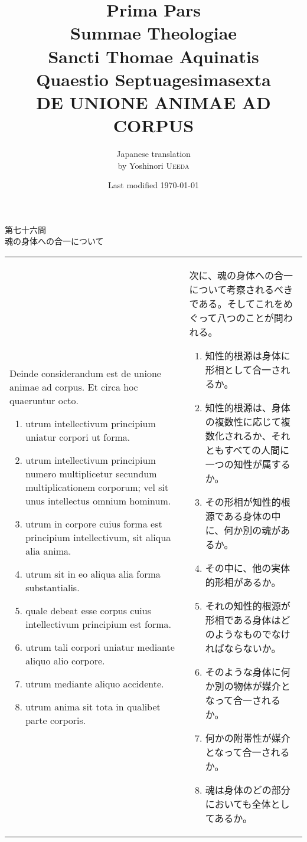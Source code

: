 \documentclass[paper=a4paper,fontsize=10pt,jafontsize=9pt,titlepage]{jlreq}
\title{{\bfseries Prima Pars}\\{\Huge Summae Theologiae}\\Sancti Thomae
Aquinatis\\{\sffamily Quaestio Septuagesimasexta}\\{\bfseries DE UNIONE ANIMAE AD CORPUS}}
\author{Japanese translation\\by Yoshinori {\scshape Ueeda}}
\date{Last modified \today}
\begin{document}
\maketitle

\begin{center}
 {\Large 第七十六問\\魂の身体への合一について}
\end{center}

\begin{longtable}{p{21em}p{21em}}
 Deinde considerandum est de unione animae ad corpus. Et circa hoc quaeruntur octo.

 \begin{enumerate}
  \item utrum intellectivum principium uniatur corpori ut forma.
  \item utrum intellectivum principium numero multiplicetur secundum multiplicationem corporum; vel sit unus intellectus omnium hominum.
  \item utrum in corpore cuius forma est principium intellectivum, sit aliqua alia anima.
  \item utrum sit in eo aliqua alia forma substantialis.
  \item quale debeat esse corpus cuius intellectivum principium est forma.
  \item utrum tali corpori uniatur mediante aliquo alio corpore.
  \item utrum mediante aliquo accidente.
  \item utrum anima sit tota in qualibet parte corporis.
 \end{enumerate}

 &

 次に、魂の身体への合一について考察されるべきである。そしてこれをめぐって八つのことが問われる。
 \begin{enumerate}
  \item 知性的根源は身体に形相として合一されるか。
  \item 知性的根源は、身体の複数性に応じて複数化されるか、それともすべての人間に一つの知性が属するか。
  \item その形相が知性的根源である身体の中に、何か別の魂があるか。
  \item その中に、他の実体的形相があるか。
  \item それの知性的根源が形相である身体はどのようなものでなければならないか。
  \item そのような身体に何か別の物体が媒介となって合一されるか。
  \item 何かの附帯性が媒介となって合一されるか。
  \item 魂は身体のどの部分においても全体としてあるか。
 \end{enumerate}

\end{longtable}
\newpage 
 
\end{document}
